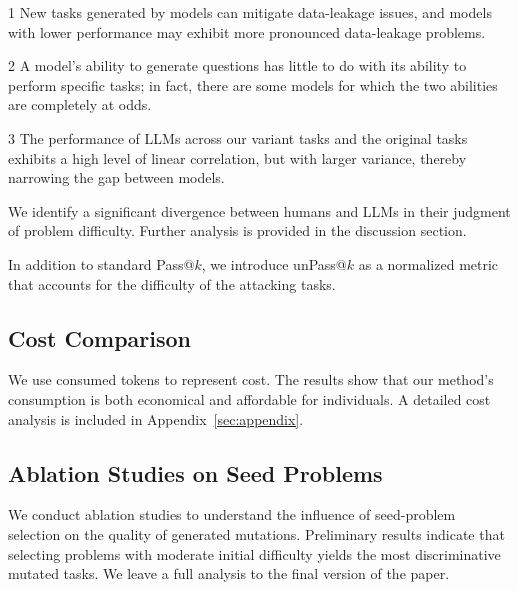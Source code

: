 

\begin{findingbox}{1}
New tasks generated by models can mitigate data-leakage issues, and models with lower performance may exhibit more pronounced data-leakage problems.
\end{findingbox}

\begin{findingbox}{2}
A model's ability to generate questions has little to do with its ability to perform specific tasks; in fact, there are some models for which the two abilities are completely at odds.
\end{findingbox}

\begin{findingbox}{3}
The performance of LLMs across our variant tasks and the original tasks exhibits a high level of linear correlation, but with larger variance, thereby narrowing the gap between models.
\end{findingbox}



We identify a significant divergence between humans and LLMs in their judgment of problem difficulty. Further analysis is provided in the discussion section.

 In addition to standard Pass@$k$, we introduce unPass@$k$ as a normalized metric that accounts for the difficulty of the attacking tasks.

\subsection{Cost Comparison}

We use consumed tokens to represent cost. The results show that our method's consumption is both economical and affordable for individuals. A detailed cost analysis is included in Appendix~\ref{sec:appendix}.

\subsection{Ablation Studies on Seed Problems}

We conduct ablation studies to understand the influence of seed-problem selection on the quality of generated mutations. Preliminary results indicate that selecting problems with moderate initial difficulty yields the most discriminative mutated tasks. We leave a full analysis to the final version of the paper.
